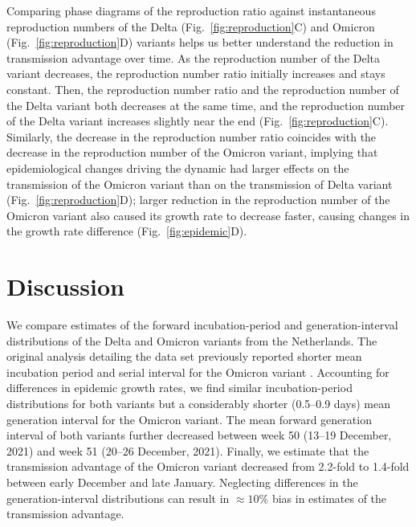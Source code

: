 \documentclass[12pt]{article}
\newcommand{\fref}[1]{Fig.~\ref{fig:#1}}
\begin{document}
Comparing phase diagrams of the reproduction ratio against instantaneous reproduction numbers of the Delta (\fref{reproduction}C) and Omicron (\fref{reproduction}D) variants helps us better understand the reduction in transmission advantage over time.
As the reproduction number of the Delta variant decreases, the reproduction number ratio initially increases and stays constant. 
Then, the reproduction number ratio and the reproduction number of the Delta variant both decreases at the same time, and the reproduction number of the Delta variant increases slightly near the end (\fref{reproduction}C).
Similarly, the decrease in the reproduction number ratio coincides with the decrease in the reproduction number of the Omicron variant, implying that epidemiological changes driving the dynamic had larger effects on the transmission of the Omicron variant than on the transmission of Delta variant (\fref{reproduction}D);
larger reduction in the reproduction number of the Omicron variant also caused its growth rate to decrease faster, causing changes in the growth rate difference (\fref{epidemic}D).

\section{Discussion}

We compare estimates of the forward incubation-period and generation-interval distributions of the Delta and Omicron variants from the Netherlands.
The original analysis detailing the data set previously reported shorter mean incubation period and serial interval for the Omicron variant \citep{backer2021omicron}.
Accounting for differences in epidemic growth rates, we find similar incubation-period distributions for both variants but a considerably shorter (0.5--0.9 days) mean generation interval for the Omicron variant.
The mean forward generation interval of both variants further decreased between week 50 (13--19 December, 2021) and week 51 (20--26 December, 2021).
Finally, we estimate that the transmission advantage of the Omicron variant decreased from 2.2-fold to 1.4-fold between early December and late January. 
Neglecting differences in the generation-interval distributions can result in $\approx 10\%$ bias in estimates of the transmission advantage.
\end{document}
